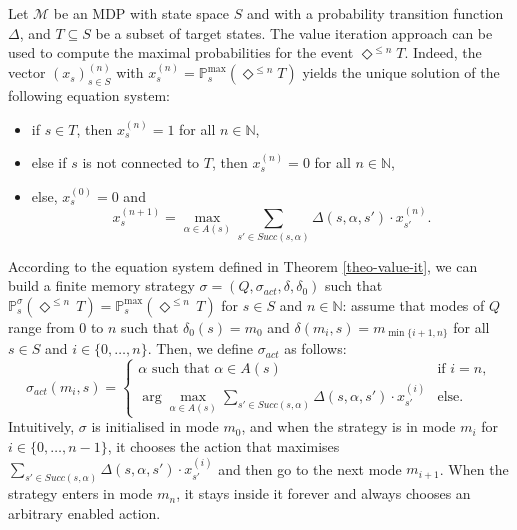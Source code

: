 \begin{theorem} \label{theo-value-it}
  Let $\mathcal{M}$ be an MDP with state space $S$ and with a probability transition function $\Delta$, and $T \subseteq S$ be a subset of target states. The value iteration approach can be used to compute the maximal probabilities for the event $\Diamond^{\leq n}T$.
  Indeed, the vector $(x_s)^{(n)}_{s \in S}$ with $x_s^{(n)} = \mathbb{P}^{\max}_s(\Diamond^{\leq n} T)$ yields the unique solution of the following equation system:
  \begin{itemize}
    \item if $s \in T$, then $x_s^{(n)}=1$ for all $n \in \mathbb{N}$,
    \item else if $s$ is not connected to $T$, then $x_s^{(n)}=0$
    for all $n \in \mathbb{N}$,
    \item else, $x_s^{(0)} = 0$ and
    \[ x_s^{(n+1)} = \max_{\alpha \in A(s)} \sum_{s' \in Succ(s, \alpha)} \Delta(s, \alpha, s') \cdot x_{s'}^{(n)}. \]
  \end{itemize}
\end{theorem}
  According to the equation system defined in Theorem \ref{theo-value-it}, we can build a finite memory strategy $\sigma = (Q, \sigma_{act}, \delta, \delta_0)$ such that $\mathbb{P}^\sigma_s(\Diamond^{\leq n}\, T) = \mathbb{P}^{\max}_s(\Diamond^{\leq n}\, T)$ for $s \in S$ and $n \in \mathbb{N}$:
  assume that modes of $Q$ range from $0$ to $n$ such that $\delta_0(s) = m_0$ and $\delta(m_i, s) = m_{\min\{i+1, n\}}$ for all $s \in S$ and $i \in \{0, \dots, n\}$. Then, we define $\sigma_{act}$ as follows:
  \[
    \sigma_{act}(m_i, s) =
    \begin{cases}
      \alpha \text{ such that } \alpha \in A(s) &\text{if }i = n,\\
      \arg \max_{\alpha \in A(s)} \sum_{s' \in Succ(s, \alpha)} \Delta(s, \alpha, s') \cdot x_{s'}^{(i)}
      & \text{else.}
    \end{cases}
  \]
  Intuitively, $\sigma$ is initialised in mode $m_0$, and when the strategy is in mode $m_i$ for $i \in \{0, \dots, n-1\}$,
  it chooses the action that maximises $\sum_{s' \in Succ(s, \alpha)} \Delta(s, \alpha, s') \cdot x_{s'}^{(i)}$ and then go to the next mode $m_{i+1}$. When the strategy enters in mode $m_n$, it stays inside it forever and always chooses an arbitrary enabled action. \\

